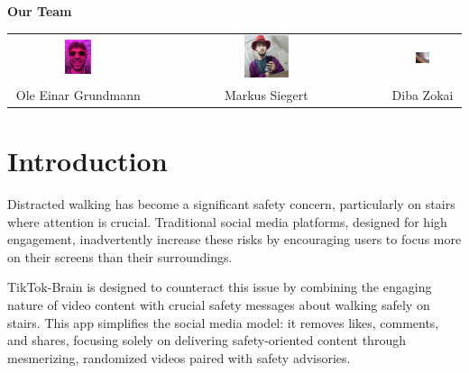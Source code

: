 \documentclass{article}
\begin{document}
\begin{titlepage}
\begin{center}
    \textbf{\textcolor{TikTokBlack}{\Large Our Team}} \\[0.5cm]

    \begin{tabular}{ccc}
        \includegraphics[width=0.2\textwidth]{./resources/ole.png} &
        \includegraphics[width=0.2\textwidth]{./resources/markus.png} &
        \includegraphics[width=0.2\textwidth]{./resources/diba.png} \\[0.3cm]
        Ole Einar Grundmann & Markus Siegert & Diba Zokai \\
    \end{tabular}
\end{center}
\end{titlepage}

\newpage
\tableofcontents
\newpage

\section{Introduction}
Distracted walking has become a significant safety concern, particularly on stairs where attention is crucial.
Traditional social media platforms, designed for high engagement,
inadvertently increase these risks by encouraging users to focus more on their screens than their surroundings.

TikTok-Brain is designed to counteract this issue by combining the engaging nature of video content
with crucial safety messages about walking safely on stairs.
This app simplifies the social media model: it removes likes, comments, and shares,
focusing solely on delivering safety-oriented content through mesmerizing, randomized videos paired with safety advisories.
\end{document}
